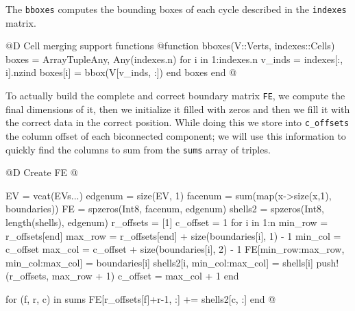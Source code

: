 \documentclass[10pt]{book}
\begin{document}
The \texttt{bboxes} computes the bounding boxes of each cycle
described in the \texttt{indexes} matrix.

@D Cell merging support functions
@{function bboxes(V::Verts, indexes::Cells)
    boxes = Array{Tuple{Any, Any}}(indexes.n)
    for i in 1:indexes.n
        v_inds = indexes[:, i].nzind
        boxes[i] = bbox(V[v_inds, :])
    end
    boxes
end
@}

To actually build the complete and correct boundary matrix \texttt{FE},
we compute the final dimensions of it, then we initialize it filled with
zeros and then we fill it with the correct data in the correct position.
While doing this we store into \texttt{c\_offsets} the column offset of each
biconnected component; we will use this information to quickly find the columns 
to sum from the \texttt{sums} array of triples.

@D Create FE
@{EV = vcat(EVs...)
edgenum = size(EV, 1)
facenum = sum(map(x->size(x,1), boundaries))
FE = spzeros(Int8, facenum, edgenum)
shells2 = spzeros(Int8, length(shells), edgenum)
r_offsets = [1]
c_offset = 1
for i in 1:n
    min_row = r_offsets[end]
    max_row = r_offsets[end] + size(boundaries[i], 1) - 1
    min_col = c_offset
    max_col = c_offset + size(boundaries[i], 2) - 1
    FE[min_row:max_row, min_col:max_col] = boundaries[i]
    shells2[i, min_col:max_col] = shells[i]
    push!(r_offsets, max_row + 1)
    c_offset = max_col + 1
end

for (f, r, c) in sums
    FE[r_offsets[f]+r-1, :] += shells2[c, :]
end
@}


\backmatter


{}

\end{document}
